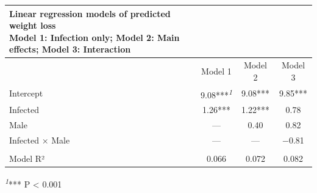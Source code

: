 \newlength\holdLTleft\newlength\holdLTright\setlength\holdLTleft{\LTleft}\relax\setlength\holdLTright{\LTright}\relax\setlength{}
\setlength{}\setlength{\LTpost}{0mm}
\begin{longtable}{@{\extracolsep{\fill}}lccc}
\caption*{
{\large Linear regression models of predicted weight loss} \\ 
{\small Model 1: Infection only; Model 2: Main effects; Model 3: Interaction}
} \\ 
\toprule
 & Model 1 & Model 2 & Model 3 \\ 
\midrule\addlinespace[2.5pt]
Intercept & 9.08***\textsuperscript{\textit{1}} & 9.08*** & 9.85*** \\ 
Infected & 1.26*** & 1.22*** & 0.78 \\ 
Male & — & 0.40 & 0.82 \\ 
Infected × Male & — & — & −0.81 \\ 
 &  &  &  \\ 
Model R² & 0.066 & 0.072 & 0.082 \\ 
\bottomrule
\end{longtable}
\begin{minipage}{\linewidth}
\textsuperscript{\textit{1}}*** P < 0.001\\
\end{minipage}
\setlength\LTleft{\holdLTleft}
\setlength\LTright{\holdLTright}
